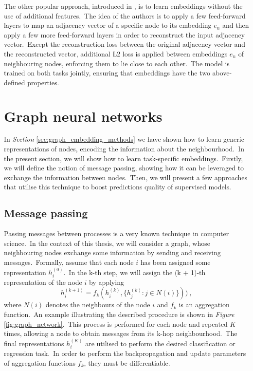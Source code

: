 \documentclass[longabstract, english, mgr]{iithesis}
\theoremstyle{default_theorem_style}\newtheorem{theorem}{Theorem}
\theoremstyle{default_theorem_style}\newtheorem{definition}{Definition}
\begin{document}
\noindent The other popular approach, introduced in \cite{sdne}, is to learn embeddings without the use of additional
features.\ The idea of the authors is to apply a few feed-forward layers to map an adjacency vector of a specific node
to its embedding $e_n$ and then apply a few more feed-forward layers in order to reconstruct the input adjacency
vector.\ Except the reconstruction loss between the original adjacency vector and the reconstructed vector, additional
L2 loss is applied between embeddings $e_n$ of neighbouring nodes, enforcing them to lie close to each other.\ The model
is trained on both tasks jointly, ensuring that embeddings have the two above-defined properties.

\section{Graph neural networks}\label{sec:graph_neural_networks}

In \textit{Section} \ref{sec:graph_embedding_methods} we have shown how to learn generic representations of nodes,
encoding the information about the neighbourhood.\ In the present section, we will show how to learn task-specific
embeddings.\ Firstly, we will define the notion of message passing, showing how it can be leveraged to exchange the
information between nodes.\ Then, we will present a few approaches that utilise this technique to boost
predictions quality of supervised models.

\subsection{Message passing}

Passing messages between processes is a very known technique in computer science.\ In the context of this thesis, we
will consider a graph, whose neighbouring nodes exchange some information by sending and receiving
messages.\ Formally, assume that each node $i$ has been assigned some representation $h_i^{(0)}$.\ In the k-th
step, we will assign the (k + 1)-th representation of the node $i$ by applying
\begin{equation}\label{eq:message_passing}
h_i^{(k + 1)} = f_k(h_i^{(k)}, \{h_j^{(k)} : j \in N(i)\}))\ ,
\end{equation}
where $N(i)$ denotes the neighbours of the node $i$ and $f_k$ is an aggregation function.\ An example illustrating
the described procedure is shown in \textit{Figure} \ref{fig:graph_network}.\ This process is performed
for each node and repeated $K$ times, allowing a node to obtain messages from its k-hop neighbourhood.\ The
final representations $h_i^{(K)}$ are utilised to perform the desired classification or regression task.\ In order to
perform the backpropagation and update parameters of aggregation functions $f_k$, they must be
differentiable.\newline
\end{document}
